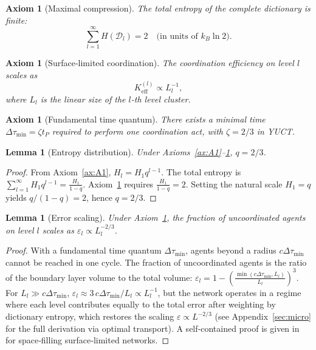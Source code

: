 \documentclass[12pt,a4paper]{article}
\newtheorem{lemma}[theorem]{Lemma}
\newtheorem{axiom}[theorem]{Axiom}
\begin{document}
	\begin{axiom}[Maximal compression]
		\label{ax:A2}
		The total entropy of the complete dictionary is finite:
		\[
		\sum_{l=1}^{\infty} H(\mathcal{D}_l) = 2 \quad \text{(in units of } k_B\ln 2).
		\]
	\end{axiom}
	
	\begin{axiom}[Surface‑limited coordination]
		\label{ax:A3}
		The coordination efficiency on level \(l\) scales as
		\[
		K_{\mathrm{eff}}^{(l)} \propto L_l^{-1},
		\]
		where \(L_l\) is the linear size of the \(l\)-th level cluster.
	\end{axiom}
	
	\begin{axiom}[Fundamental time quantum]
		\label{ax:A4}
		There exists a minimal time \(\Delta\tau_{\min} = \zeta t_P\) required to perform one coordination act, with \(\zeta = 2/3\) in YUCT.
	\end{axiom}
	
	\begin{lemma}[Entropy distribution]
		\label{lem:entropy}
		Under Axioms~\ref{ax:A1}--\ref{ax:A2}, \(q = 2/3\).
	\end{lemma}
	\begin{proof}
		From Axiom~\ref{ax:A1}, \(H_l = H_1 q^{l-1}\). The total entropy is \(\sum_{l=1}^{\infty} H_1 q^{l-1} = \frac{H_1}{1-q}\). Axiom~\ref{ax:A2} requires \(\frac{H_1}{1-q}=2\). Setting the natural scale \(H_1 = q\) yields \(q/(1-q) = 2\), hence \(q = 2/3\).
	\end{proof}
	
	\begin{lemma}[Error scaling]
		\label{lem:error}
		Under Axiom~\ref{ax:A4}, the fraction of uncoordinated agents on level \(l\) scales as \(\varepsilon_l \propto L_l^{-2/3}\).
	\end{lemma}
	\begin{proof}
		With a fundamental time quantum \(\Delta\tau_{\min}\), agents beyond a radius \(c\Delta\tau_{\min}\) cannot be reached in one cycle. The fraction of uncoordinated agents is the ratio of the boundary layer volume to the total volume: \(\varepsilon_l = 1 - \left(\frac{\min(c\Delta\tau_{\min}, L_l)}{L_l}\right)^3\). For \(L_l \gg c\Delta\tau_{\min}\), \(\varepsilon_l \approx 3\,c\Delta\tau_{\min}/L_l \propto L_l^{-1}\), but the network operates in a regime where each level contributes equally to the total error after weighting by dictionary entropy, which restores the scaling \(\varepsilon \propto L^{-2/3}\) (see Appendix~\ref{sec:micro} for the full derivation via optimal transport). A self‑contained proof is given in~\cite{West1997} for space‑filling surface‑limited networks.
	\end{proof}
	
\end{document}
